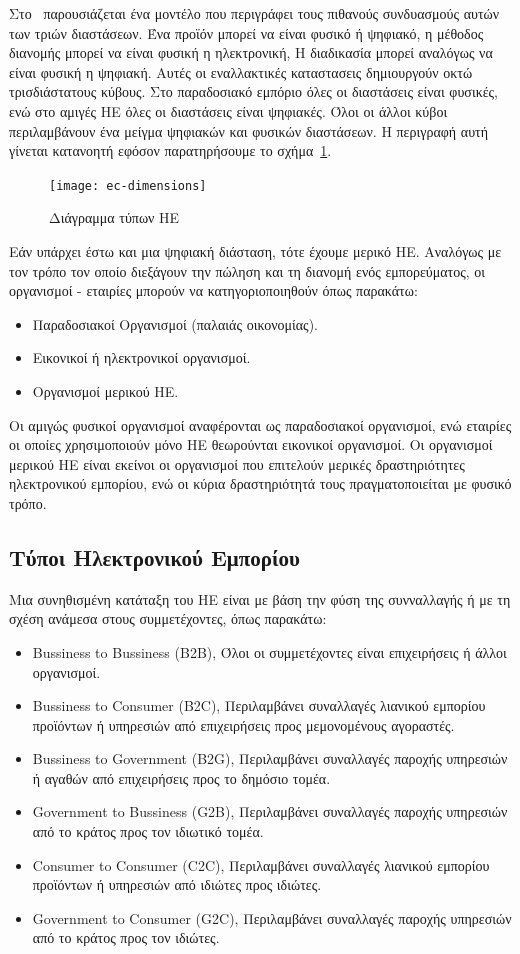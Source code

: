 \documentclass[12pt]{report}
\begin{document}
Στο~\cite{choi_stahl_whinston_1997} παρουσιάζεται ένα μοντέλο που περιγράφει τους πιθανούς συνδυασμούς αυτών των τριών διαστάσεων. Ένα προϊόν μπορεί να είναι φυσικό ή ψηφιακό, η μέθοδος διανομής μπορεί να είναι φυσική η ηλεκτρονική, Η διαδικασία μπορεί αναλόγως να είναι φυσική η ψηφιακή. Αυτές οι εναλλακτικές καταστασεις δημιουργούν οκτώ τρισδιάστατους κύβους. Στο παραδοσιακό εμπόριο όλες οι διαστάσεις είναι φυσικές, ενώ στο αμιγές ΗΕ όλες οι διαστάσεις είναι ψηφιακές. Όλοι οι άλλοι κύβοι περιλαμβάνουν ένα μείγμα ψηφιακών και φυσικών διαστάσεων. Η περιγραφή αυτή γίνεται κατανοητή εφόσον παρατηρήσουμε το σχήμα~\ref{fig:ec_dimensions}.
\begin{figure}[h]
\centering
\texttt{[image: ec-dimensions]}
\caption{Διάγραμμα τύπων ΗΕ}
\label{fig:ec_dimensions}
\end{figure}
Εάν υπάρχει έστω και μια ψηφιακή διάσταση, τότε έχουμε μερικό ΗΕ. Αναλόγως με τον τρόπο τον οποίο διεξάγουν την πώληση και τη διανομή ενός εμπορεύματος, οι οργανισμοί - εταιρίες μπορούν να κατηγοριοποιηθούν όπως παρακάτω:
\begin{itemize}
  \item Παραδοσιακοί Οργανισμοί (παλαιάς οικονομίας).
  \item Εικονικοί ή ηλεκτρονικοί οργανισμοί.
  \item Οργανισμοί μερικού ΗΕ.
\end{itemize}
Οι αμιγώς φυσικοί οργανισμοί αναφέρονται ως παραδοσιακοί οργανισμοί, ενώ εταιρίες οι οποίες χρησιμοποιούν μόνο ΗΕ θεωρούνται εικονικοί οργανισμοί. Οι οργανισμοί μερικού ΗΕ είναι εκείνοι οι οργανισμοί που επιτελούν μερικές δραστηριότητες ηλεκτρονικού εμπορίου, ενώ οι κύρια δραστηριότητά τους πραγματοποιείται με φυσικό τρόπο.

\subsection{Τύποι Ηλεκτρονικού Εμπορίου}
Μια συνηθισμένη κατάταξη του ΗΕ είναι με βάση την φύση της συνναλλαγής ή με τη σχέση ανάμεσα στους συμμετέχοντες, όπως παρακάτω:
\begin{itemize}
  \item \textlatin{Bussiness to Bussiness (B2B)}, Όλοι οι συμμετέχοντες είναι επιχειρήσεις ή άλλοι οργανισμοί.
  \item \textlatin{Bussiness to Consumer (B2C)}, Περιλαμβάνει συναλλαγές λιανικού εμπορίου προϊόντων ή υπηρεσιών από επιχειρήσεις προς μεμονομένους αγοραστές.
  \item \textlatin{Bussiness to Government (B2G)}, Περιλαμβάνει συναλλαγές παροχής υπηρεσιών ή αγαθών από επιχειρήσεις προς το δημόσιο τομέα.
  \item \textlatin{Government to Bussiness (G2B)}, Περιλαμβάνει συναλλαγές παροχής υπηρεσιών από το κράτος προς τον ιδιωτικό τομέα.
  \item \textlatin{Consumer to Consumer (C2C)}, Περιλαμβάνει συναλλαγές λιανικού εμπορίου προϊόντων ή υπηρεσιών από ιδιώτες προς ιδιώτες.
  \item \textlatin{Government to Consumer (G2C)}, Περιλαμβάνει συναλλαγές παροχής υπηρεσιών από το κράτος προς τον ιδιώτες.
\end{itemize}
\end{document}

